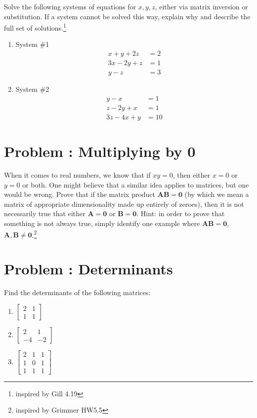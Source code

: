 \documentclass[11pt]{article}
\newcounter{problem}
\newcommand{\problem}[1]{\stepcounter{problem}\section*{Problem \theproblem: #1}}
\begin{document}
Solve the following systems of equations for $x, y, z$, either via
matrix inversion or substitution. If a system cannot be solved this way,
explain why and describe the full set of solutions.\footnote{inspired by Gill 4.19}

\begin{enumerate}[label=\alph*.]
\item System \#1
  \[
  \begin{aligned}
  x + y + 2z &= 2 \\
  3x - 2y + z &= 1 \\
  y - z &= 3
  \end{aligned}
  \]
\item System \#2
  \[
  \begin{aligned}
  y-x &= 1 \\
  z-2y+x &= 1 \\
  3z-4x+y &=10
  \end{aligned}
  \]
\end{enumerate}

\problem{Multiplying by $\mathbf{0}$}

When it comes to real numbers, we know that if $xy = 0$, then either
$x=0$ or $y=0$ or both. One might believe that a similar idea
applies to matrices, but one would be wrong. Prove that if the matrix
product $\mathbf{AB} = \mathbf{0}$ (by which we mean a matrix of
appropriate dimensionality made up entirely of zeroes), then it is not
necessarily true that either $\mathbf{A} = \mathbf{0}$ or
$\mathbf{B} = \mathbf{0}$. Hint: in order to prove that something is
not always true, simply identify one example where
$\mathbf{AB} = \mathbf{0}$, $\mathbf{A}, \mathbf{B} \neq
\mathbf{0}$.\footnote{inspired by Grimmer HW5.5}

\problem{Determinants}
Find the determinants of the following matrices:
\begin{enumerate}[label=\alph*.]
\item $\begin{bmatrix} 2 & 1 \\ 1 & 1 \end{bmatrix}$
\item $\begin{bmatrix} 2 & 1 \\ -4 & -2 \end{bmatrix}$
\item $\begin{bmatrix} 2 & 1 & 1 \\ 1 & 0 & 1 \\ 1 & 1 & 1 \end{bmatrix}$
\end{enumerate}
\end{document}
